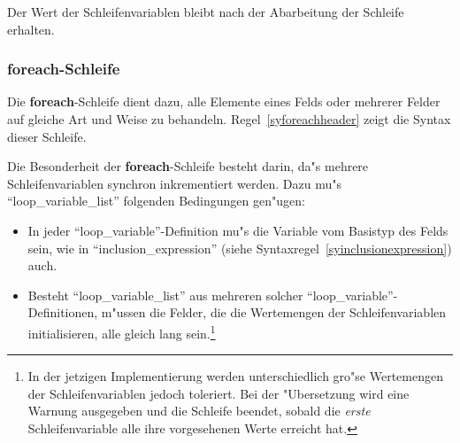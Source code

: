 Der Wert der Schleifenvariablen
bleibt nach der Abarbeitung der Schleife erhalten.
 



\subsubsection{{\bf foreach}-Schleife}
\label{foreachloop}

 
 Die {\bf foreach}-Schleife
dient dazu, alle Elemente eines Felds oder mehrerer Felder
auf gleiche Art und Weise zu behandeln. Regel~\ref{syforeachheader}
zeigt die Syntax dieser Schleife.

\begin{center}
\end{center}

Die Besonderheit der {\bf foreach}-Schleife besteht darin, da"s
mehrere Schleifenvariablen synchron inkrementiert werden. Dazu mu"s
``loop\_variable\_list'' folgenden Bedingungen gen"ugen:

\begin{itemize}
  \item In jeder ``loop\_variable''-Definition mu"s die Variable vom Basistyp des Felds
	sein, wie in ``inclusion\_expression'' (siehe Syntaxregel~\ref{syinclusionexpression}) auch.
  \item Besteht ``loop\_variable\_list'' aus mehreren solcher ``loop\_variable''-Definitionen,
	m"ussen die Felder, die die Wertemengen der
	Schleifenvariablen
	initialisieren, alle gleich lang sein.\footnote{In der
jetzigen Implementierung werden unterschiedlich gro"se Wertemengen der
Schleifenvariablen jedoch toleriert. Bei der "Ubersetzung wird eine
Warnung ausgegeben und die Schleife beendet, sobald die {\it erste\/}
Schleifenvariable alle ihre vorgesehenen Werte erreicht hat.}
\end{itemize}

